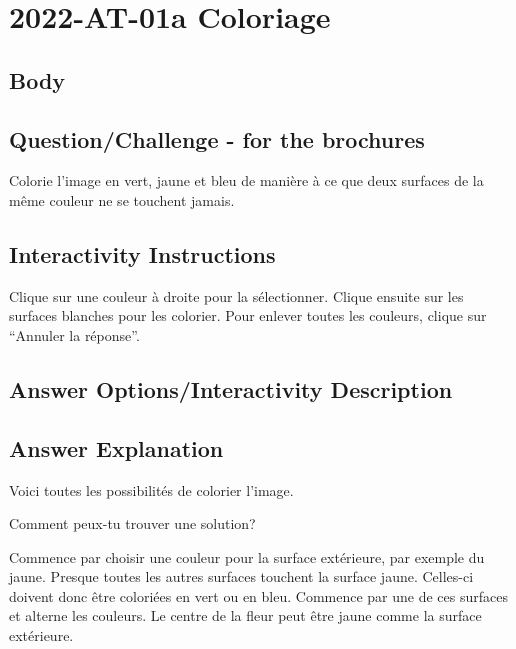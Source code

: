 \documentclass[a4paper,11pt]{report}
\newcommand{\taskGraphicsFolder}{..}
\begin{document}
\section*{\centering{} 2022-AT-01a Coloriage}


\subsection*{Body}

{\centering%
\par}

{\em


\subsection*{Question/Challenge - for the brochures}

Colorie l’image en vert, jaune et bleu de manière à ce que deux surfaces de la même couleur ne se touchent jamais.

}


\subsection*{Interactivity Instructions}

Clique sur une couleur à droite pour la sélectionner. Clique ensuite sur les surfaces blanches pour les colorier. Pour enlever toutes les couleurs, clique sur “Annuler la réponse”.

\begingroup
\renewcommand{\arraystretch}{1.5}
\subsection*{Answer Options/Interactivity Description}



\endgroup

\subsection*{Answer Explanation}

Voici toutes les possibilités de colorier l’image.

{\centering%
\par}

Comment peux-tu trouver une solution?

Commence par choisir une couleur pour la surface extérieure, par exemple du jaune. Presque toutes les autres surfaces touchent la surface jaune. Celles-ci doivent donc être coloriées en vert ou en bleu. Commence par une de ces surfaces et alterne les couleurs. Le centre de la fleur peut être jaune comme la surface extérieure.
\end{document}
